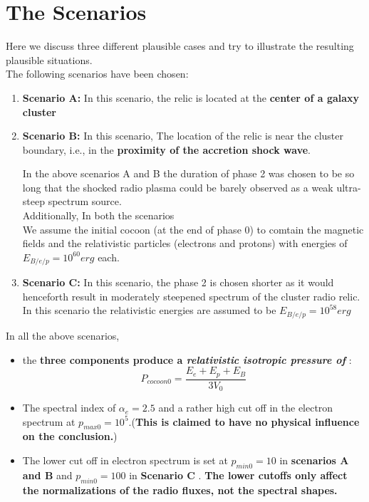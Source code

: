 \documentclass[12pt]{report}
\newcommand{\tbf}[1]{\textbf{#1}}
\newcommand{\tit}[1]{\textit{#1}}
\newcommand{\cbox}{tcolorbox}
\begin{document}
\section{The Scenarios}
Here we discuss three different plausible cases and try to illustrate the resulting plausible situations.\\
The following scenarios have been chosen:
\begin{enumerate}
\item \tbf{Scenario A:} In this scenario, the relic is located at the \tbf{center of a galaxy cluster}
\item \tbf{Scenario B:} In this scenario, The location of the relic is near the cluster boundary, i.e., in the \tbf{proximity of the accretion shock wave}.
\begin{\cbox}
In the above scenarios A and B the duration of phase 2 was chosen to be so long that the shocked radio plasma could be barely observed as a weak ultra-steep spectrum source.\\
Additionally, In both the scenarios\\
We assume the initial cocoon (at the end of phase 0) to comtain the magnetic fields and the relativistic particles (electrons and protons)  with energies of $E_{B/e/p}=10^{60}erg$ each. 
\end{\cbox}
\item \tbf{Scenario C:} In this scenario, the phase 2 is chosen shorter as it would henceforth result in moderately steepened spectrum of the cluster radio relic. In this scenario the relativistic energies are assumed to be $E_{B/e/p}=10^{58}erg$
\end{enumerate}
In all the above scenarios,
\begin{itemize}
\item the \tbf{three components produce a \tit{relativistic isotropic pressure of }}:
\begin{equation}\label{eqisoP}
P_{cocoon0}=\frac{E_e+E_p+E_B}{3V_0}
\end{equation}
 \item The spectral index of $\alpha_e=2.5$ and a rather high cut off in the electron spectrum at $p_{max0}=10^5$.(\tbf{This is claimed to have no physical influence on the conclusion.})
 \item The lower cut off in electron spectrum is set at $p_{min0}=10$ in \tbf{scenarios A and B} and $p_{min0}=100$ in \tbf{Scenario C} .\tbf{ The lower cutoffs only affect the normalizations of the radio fluxes, not the spectral shapes. }
\end{itemize}
\end{document}
